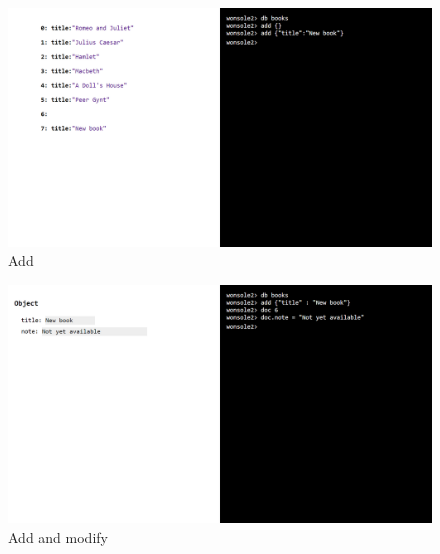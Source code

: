 \begin{figure}
\centering
\includegraphics[width=\textwidth]{../../manual/screenshot/wonsole2/wonsole2-48.png}
\caption{Add}
\label{wonsole2-48}
\end{figure}

\begin{figure}
\centering
\includegraphics[width=\textwidth]{../../manual/screenshot/wonsole2/wonsole2-55.png}
\caption{Add and modify}
\label{wonsole2-55}
\end{figure}

